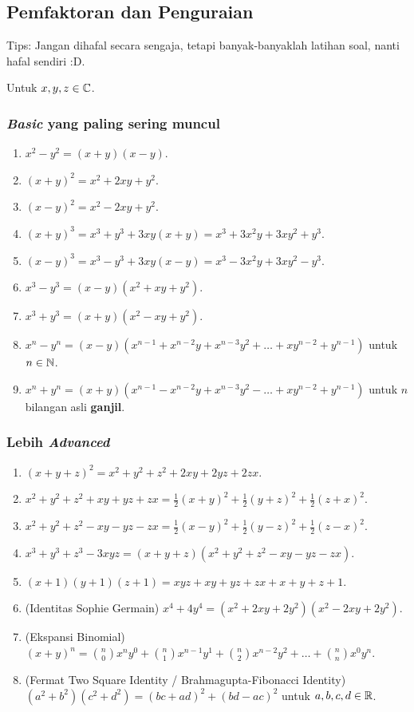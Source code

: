 \subsection{Pemfaktoran dan Penguraian}
Tips: Jangan dihafal secara sengaja, tetapi banyak-banyaklah latihan soal, nanti hafal sendiri :D.
	
	Untuk $x,y,z \in \mathbb C$.

        \subsubsection{\textit{Basic} yang paling sering muncul}
        \begin{enumerate}
            \item $x^2-y^2 = (x+y)(x-y)$.
	    \item $(x+y)^2 = x^2+2xy+y^2$.
	    \item $(x-y)^2 = x^2-2xy+y^2$.
            \item $(x+y)^3 = x^3+y^3+3xy(x+y) = x^3+3x^2y+3xy^2+y^3$. 
	    \item $(x-y)^3 = x^3-y^3+3xy(x-y) = x^3-3x^2y+3xy^2-y^3$. 
	    \item $x^3-y^3 = (x-y)(x^2+xy+y^2)$.
	    \item $x^3+y^3 = (x+y)(x^2-xy+y^2)$.
	    \item $x^n-y^n = (x-y)(x^{n-1}+x^{n-2}y+x^{n-3}y^2+\dots+xy^{n-2}+y^{n-1})$ untuk $n \in \mathbb N$.
	    \item $x^n+y^n = (x+y)(x^{n-1}-x^{n-2}y+x^{n-3}y^2-\dots+xy^{n-2}+y^{n-1})$ untuk $n$ bilangan asli \textbf{ganjil}.
        \end{enumerate}

        \subsubsection{Lebih \textit{Advanced}}
	\begin{enumerate}
	    \item $(x+y+z)^2 = x^2+y^2+z^2+2xy+2yz+2zx$.
	    \item $x^2+y^2+z^2+xy+yz+zx = \frac12(x+y)^2+\frac12(y+z)^2+\frac12(z+x)^2$.
	    \item $x^2+y^2+z^2-xy-yz-zx = \frac12(x-y)^2+\frac12(y-z)^2+\frac12(z-x)^2$.
	    \item $x^3+y^3+z^3-3xyz = (x+y+z)(x^2+y^2+z^2-xy-yz-zx)$.
	    \item $(x+1)(y+1)(z+1)=xyz+xy+yz+zx+x+y+z+1$.
	    \item (Identitas Sophie Germain) $x^4+4y^4=(x^2+2xy+2y^2)(x^2-2xy+2y^2)$.
	    \item (Ekspansi Binomial) $(x+y)^n = {n \choose 0}x^ny^0 + {n \choose 1}x^{n-1}y^1+{n \choose 2}x^{n-2}y^2 + \dots + {n \choose n}x^0y^n$.
	    \item (Fermat Two Square Identity / Brahmagupta-Fibonacci Identity)\\
        $(a^2+b^2)(c^2+d^2)=(bc+ad)^2+(bd-ac)^2$ untuk $a,b,c,d \in \mathbb R$.
	\end{enumerate}